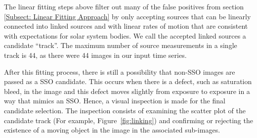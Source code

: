 \documentclass{aastex631}
\begin{document}

The linear fitting steps above filter out many of the false positives from section \ref{Subsect: Linear Fitting Approach} by only accepting sources that can be linearly connected into linked sources and with linear rates of motion that are consistent with expectations for solar system bodies.
We call the accepted linked sources a candidate ``track''. 
The maximum number of source measurements in a single track is 44, as there were 44 images in our input time series.



After this fitting process, there is still a possibility that non-SSO images are passed as a SSO candidate.
This occurs when there is a defect, such as saturation bleed, in the image and this defect moves slightly from exposure to exposure in a way that mimics an SSO.
Hence, a visual inspection is made for the final candidate selection.
The inspection consists of examining the scatter plot of the candidate track (For example, Figure~\ref{fig:linking}) and confirming or rejecting the existence of a moving object in the image in the associated sub-images.
\end{document}
